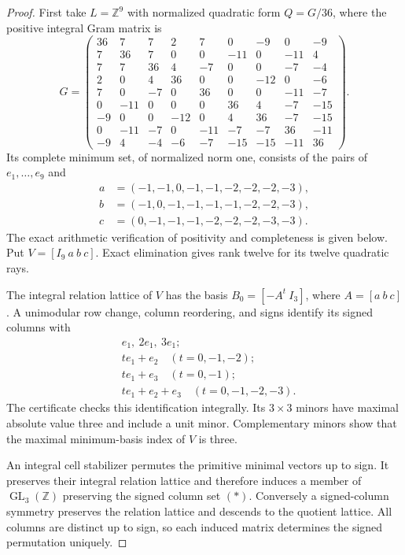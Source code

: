 \documentclass[11pt,a4paper]{article}
\theoremstyle{definition}
\begin{document}
\begin{proof}
First take $L=\mathbb Z^9$ with normalized quadratic form $Q=G/36$,
where the positive integral Gram matrix is
\begingroup
\setlength{\arraycolsep}{3pt}
\[
G=\begin{pmatrix}
36&7&7&2&7&0&-9&0&-9\\
7&36&7&0&0&-11&0&-11&4\\
7&7&36&4&-7&0&0&-7&-4\\
2&0&4&36&0&0&-12&0&-6\\
7&0&-7&0&36&0&0&-11&-7\\
0&-11&0&0&0&36&4&-7&-15\\
-9&0&0&-12&0&4&36&-7&-15\\
0&-11&-7&0&-11&-7&-7&36&-11\\
-9&4&-4&-6&-7&-15&-15&-11&36
\end{pmatrix}.
\]
\endgroup
Its complete minimum set, of normalized norm one, consists of the
pairs of $e_1,\ldots,e_9$ and
\begin{align*}
a&=(-1,-1,0,-1,-1,-2,-2,-2,-3),\\
b&=(-1,0,-1,-1,-1,-1,-2,-2,-3),\\
c&=(0,-1,-1,-1,-2,-2,-2,-3,-3).
\end{align*}
The exact arithmetic verification of positivity and completeness is
given below. Put $V=[I_9\ a\ b\ c]$. Exact elimination gives rank
twelve for its twelve quadratic rays.

The integral relation lattice of $V$ has the basis
$B_0=[-A^t\ I_3]$, where $A=[a\ b\ c]$. A unimodular row change,
column reordering, and signs identify its signed columns with
\[
\begin{split}
 &e_1,\ 2e_1,\ 3e_1;\\
 &te_1+e_2 \quad(t=0,-1,-2);\\
 &te_1+e_3 \quad(t=0,-1);\\
 &te_1+e_2+e_3 \quad(t=0,-1,-2,-3).
\end{split}
\tag{*}
\]
The certificate checks this identification integrally. Its
$3\times3$ minors have maximal absolute value three and include a
unit minor. Complementary minors show that the maximal minimum-basis
index of $V$ is three.

An integral cell stabilizer permutes the primitive minimal vectors
up to sign. It preserves their integral relation lattice and therefore
induces a member of $\operatorname{GL}_3(\mathbb Z)$ preserving the
signed column set $(\ast)$. Conversely a signed-column symmetry
preserves the relation lattice and descends to the quotient lattice.
All columns are distinct up to sign, so each induced matrix determines
the signed permutation uniquely.


\end{proof}
\end{document}
